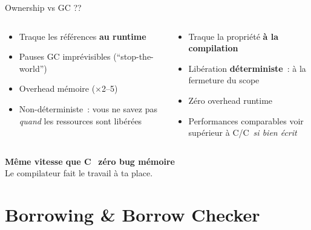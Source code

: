 \documentclass[aspectratio=169, 10pt]{beamer}
\newcommand{\CC}{C\nolinebreak\hspace{-.05em}\raisebox{.3ex}{\scriptsize\bfseries +}\nolinebreak\hspace{-.10em}\raisebox{.3ex}{\scriptsize\bfseries +}}
\begin{document}
\begin{frame}{Ownership vs GC ??}
  \begin{columns}[c]
    \begin{tcolorbox}[dangerbox, title={\faTrash\ GC (Java, Go, Python\ldots)}]
      \begin{itemize}\small
        \item Traque les références \textbf{au runtime}
        \item Pauses GC imprévisibles (``stop-the-world'')
        \item Overhead mémoire ($\times$2--5)
        \item Non-déterministe~: vous ne savez pas \textit{quand} les ressources sont libérées
      \end{itemize}
    \end{tcolorbox}

    \begin{tcolorbox}[safebox, title={\faRust\ Rust --- Ownership at compile time}]
      \begin{itemize}\small
        \item Traque la propriété \textbf{à la compilation}
        \item Libération \textbf{déterministe}~: à la fermeture du scope
        \item Zéro overhead runtime
        \item Performances comparables voir supérieur à C/\CC\, \textit{si bien écrit}
      \end{itemize}
    \end{tcolorbox}
  \end{columns}
  \vspace{0.7em}
  \begin{center}
    \begin{tcolorbox}[rulebox, title={\faRust\ La promesse de Rust}, width=0.85\textwidth]
      \centering\large
      \textbf{Même vitesse que C} \faPlus\ \textbf{zéro bug mémoire}\\[0.3em]
      \small Le compilateur fait le travail à ta place.
    \end{tcolorbox}
  \end{center}
\end{frame}

\section{Borrowing \& Borrow Checker}
\end{document}

